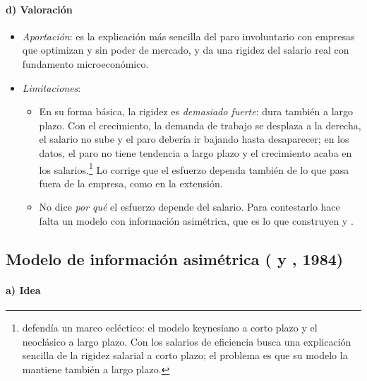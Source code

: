 \documentclass[11pt]{article}
\begin{document}
\paragraph{d) Valoración}

\begin{itemize}
\item \emph{Aportación}: es la explicación más sencilla del paro involuntario con empresas que optimizan y sin poder de mercado, y da una rigidez del salario real con fundamento microeconómico.
\item \emph{Limitaciones}:
  \begin{itemize}
  \item En su forma básica, la rigidez es \emph{demasiado fuerte}: dura también a largo plazo. Con el crecimiento, la demanda de trabajo se desplaza a la derecha, el salario no sube y el paro debería ir bajando hasta desaparecer; en los datos, el paro no tiene tendencia a largo plazo y el crecimiento acaba en los salarios.\footnote{ defendía un marco ecléctico: el modelo keynesiano a corto plazo y el neoclásico a largo plazo. Con los salarios de eficiencia busca una explicación sencilla de la rigidez salarial a corto plazo; el problema es que su modelo la mantiene también a largo plazo.} Lo corrige que el esfuerzo dependa también de lo que pasa fuera de la empresa, como en la extensión.
  \item No dice \emph{por qué} el esfuerzo depende del salario. Para contestarlo hace falta un modelo con información asimétrica, que es lo que construyen  y .
  \end{itemize}
\end{itemize}

\subsection{Modelo de información asimétrica ( y , 1984)}\label{sec:shapiro-stiglitz}

\paragraph{a) Idea}
\end{document}
